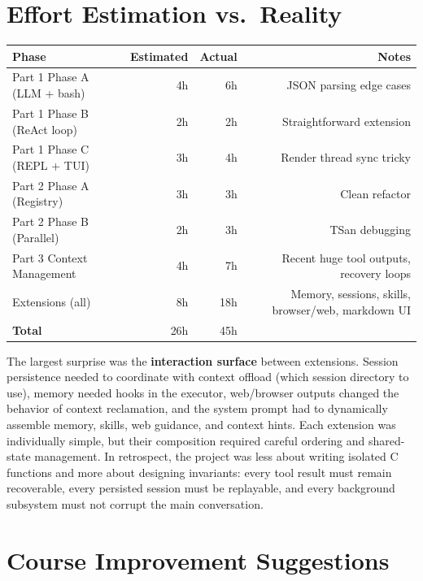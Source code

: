 \documentclass[11pt,a4paper]{article}
\begin{document}
\section{Effort Estimation vs.\ Reality}

\begin{center}
\small
\begin{tabular}{lrrr}
\toprule
\textbf{Phase} & \textbf{Estimated} & \textbf{Actual} & \textbf{Notes} \\
\midrule
Part 1 Phase A (LLM + bash)     & 4h  & 6h  & JSON parsing edge cases \\
Part 1 Phase B (ReAct loop)     & 2h  & 2h  & Straightforward extension \\
Part 1 Phase C (REPL + TUI)     & 3h  & 4h  & Render thread sync tricky \\
Part 2 Phase A (Registry)       & 3h  & 3h  & Clean refactor \\
Part 2 Phase B (Parallel)       & 2h  & 3h  & TSan debugging \\
Part 3 Context Management       & 4h  & 7h  & Recent huge tool outputs, recovery loops \\
Extensions (all)                & 8h  & 18h & Memory, sessions, skills, browser/web, markdown UI \\
\midrule
\textbf{Total}                  & 26h & 45h & \\
\bottomrule
\end{tabular}
\end{center}

The largest surprise was the \textbf{interaction surface} between extensions.
Session persistence needed to coordinate with context offload (which session
directory to use), memory needed hooks in the executor, web/browser outputs
changed the behavior of context reclamation, and the system prompt had to
dynamically assemble memory, skills, web guidance, and context hints. Each
extension was individually simple, but their composition required careful
ordering and shared-state management. In retrospect, the project was less about
writing isolated C functions and more about designing invariants: every tool
result must remain recoverable, every persisted session must be replayable, and
every background subsystem must not corrupt the main conversation.

\section{Course Improvement Suggestions}
\end{document}
